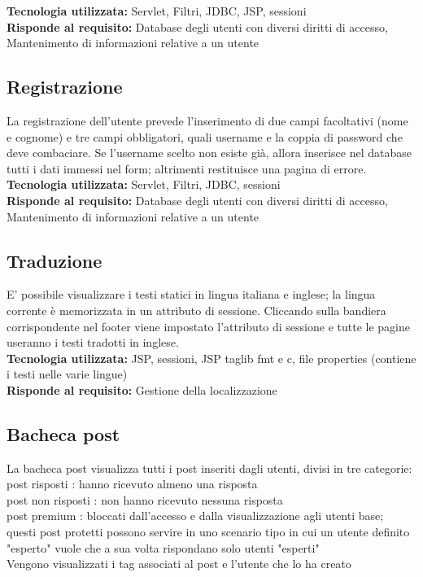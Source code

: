 \documentclass{article} %
\begin{document}
    \textbf{Tecnologia utilizzata:} Servlet, Filtri, JDBC, JSP, sessioni \\
    \textbf{Risponde al requisito:} Database degli utenti con diversi diritti di accesso, Mantenimento di informazioni relative a un utente
    
    \subsection{Registrazione}
    La registrazione dell'utente prevede l'inserimento di due campi facoltativi (nome e cognome) e tre campi obbligatori,
    quali username e la coppia di password che deve combaciare. Se l'username scelto non esiste già, allora inserisce
    nel database tutti i dati immessi nel form; altrimenti restituisce una pagina di errore. \\
    
    \textbf{Tecnologia utilizzata:} Servlet, Filtri, JDBC, sessioni \\
    \textbf{Risponde al requisito:} Database degli utenti con diversi diritti di accesso, Mantenimento di informazioni relative a un utente

    \subsection{Traduzione}

    E' possibile visualizzare i testi statici in lingua italiana e inglese; la lingua corrente è memorizzata in un attributo
    di sessione. Cliccando sulla bandiera corrispondente nel footer viene impostato l'attributo di sessione e tutte le pagine
    useranno i testi tradotti in inglese. \\

    \textbf{Tecnologia utilizzata:} JSP, sessioni, JSP taglib fmt e c, file properties (contiene i testi nelle varie lingue) \\
    \textbf{Risponde al requisito:} Gestione della localizzazione


    \subsection{Bacheca post}

    La bacheca post visualizza tutti i post inseriti dagli utenti, divisi in tre categorie: \\
    post risposti : hanno ricevuto almeno una risposta \\
    post non risposti : non hanno ricevuto nessuna risposta \\
    post premium : bloccati dall'accesso e dalla visualizzazione agli utenti base; questi post protetti possono servire in uno scenario tipo in cui un utente definito "esperto" vuole che a sua volta rispondano solo utenti "esperti" \\
    Vengono visualizzati i tag associati al post e l'utente che lo ha creato 
    
\end{document}
